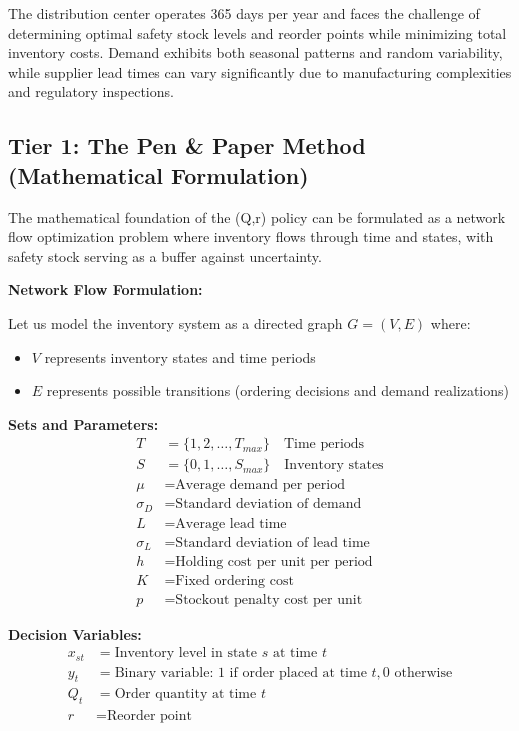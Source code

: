 \documentclass{article}
\begin{document}
The distribution center operates 365 days per year and faces the challenge of determining optimal safety stock levels and reorder points while minimizing total inventory costs. Demand exhibits both seasonal patterns and random variability, while supplier lead times can vary significantly due to manufacturing complexities and regulatory inspections.

\subsection{Tier 1: The Pen \& Paper Method (Mathematical Formulation)}

The mathematical foundation of the (Q,r) policy can be formulated as a network flow optimization problem where inventory flows through time and states, with safety stock serving as a buffer against uncertainty.

\textbf{Network Flow Formulation:}

Let us model the inventory system as a directed graph $G = (V, E)$ where:
\begin{itemize}
\item $V$ represents inventory states and time periods
\item $E$ represents possible transitions (ordering decisions and demand realizations)
\end{itemize}

\textbf{Sets and Parameters:}
\begin{align}
T &= \{1, 2, \ldots, T_{max}\} \quad \text{Time periods} \\
S &= \{0, 1, \ldots, S_{max}\} \quad \text{Inventory states} \\
\mu &= \text{Average demand per period} \\
\sigma_D &= \text{Standard deviation of demand} \\
L &= \text{Average lead time} \\
\sigma_L &= \text{Standard deviation of lead time} \\
h &= \text{Holding cost per unit per period} \\
K &= \text{Fixed ordering cost} \\
p &= \text{Stockout penalty cost per unit}
\end{align}

\textbf{Decision Variables:}
\begin{align}
x_{st} &= \text{Inventory level in state } s \text{ at time } t \\
y_{t} &= \text{Binary variable: 1 if order placed at time } t, 0 \text{ otherwise} \\
Q_{t} &= \text{Order quantity at time } t \\
r &= \text{Reorder point}
\end{align}
\end{document}
